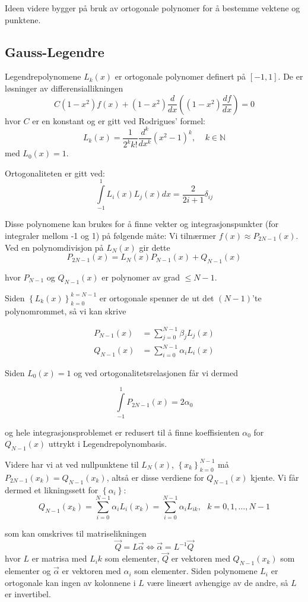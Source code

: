 \documentclass[norsk, 12pt]{article}
\newcommand{\f}{\frac}
\begin{document}
Ideen videre bygger på bruk av ortogonale polynomer for å bestemme vektene og punktene.

\subsection{Gauss-Legendre}
Legendrepolynomene $L_k(x)$ er ortogonale polynomer definert på $[-1, 1]$. De er løsninger av differensiallikningen
$$C(1-x^2)f(x)+(1-x^2)\f{d}{dx}\left((1-x^2)\f{df}{dx}\right)=0$$
hvor $C$ er en konstant og er gitt ved Rodrigues' formel:
$$L_k(x) = \f{1}{2^kk!}\f{d^k}{dx^k}(x^2-1)^k,\ \ \ \ \ k\in\mathbb{N}$$
med $L_0(x) = 1$.

Ortogonaliteten er gitt ved:
$$\int\limits_{-1}^1 L_i(x)L_j(x)dx = \f{2}{2i+1}\delta_{ij}$$

Disse polynomene kan brukes for å finne vekter og integrasjonspunkter (for integraler mellom -1 og 1) på følgende måte:
Vi tilnærmer $f(x) \approx P_{2N-1}(x)$. Ved en polynomdivisjon på $L_N(x)$ gir dette
$$P_{2N-1}(x) = L_N(x)P_{N-1}(x)+Q_{N-1}(x)$$

hvor $P_{N-1}$ og $Q_{N-1}(x)$ er polynomer av grad $\leq N-1$.

Siden $\left\{L_k(x)\right\}_{k=0}^{k=N-1}$ er ortogonale spenner de ut det $(N-1)$'te polynomrommet, så vi kan skrive

\begin{align}
 P_{N-1}(x) &= \sum\limits_{j=0}^{N-1}\beta_j L_j(x)\\
 Q_{N-1}(x) &= \sum\limits_{i=0}^{N-1}\alpha_i L_i(x)
\end{align}

Siden $L_0(x) = 1$ og ved ortogonalitetsrelasjonen får vi dermed

$$\int\limits_{-1}^1 P_{2N-1}(x) = 2\alpha_0$$

og hele integrasjonsproblemet er redusert til å finne koeffisienten $\alpha_0$ for $Q_{N-1}(x)$ uttrykt i
Legendrepolynombasis.

Videre har vi at ved nullpunktene til $L_N(x)$, $\left\{x_k\right\}_{k=0}^{N-1}$ må
$P_{2N-1}(x_k) = Q_{N-1}(x_k)$, altså er disse verdiene for $Q_{N-1}(x)$ kjente.
Vi får dermed et likningssett for $\left\{\alpha_i\right\}$:
$$Q_{N-1}(x_k) = \sum\limits_{i=0}^{N-1}\alpha_i L_i(x_k) = \sum_{i=0}^{N-1}\alpha_i L_{ik},\ \ \ k = 0,1,\dots ,N-1$$

som kan omskrives til matriselikningen
$$\vec Q = L\vec\alpha \Leftrightarrow \vec \alpha = L^{-1}\vec Q$$
hvor $L$ er matrisa med $L_ik$ som elementer, $\vec Q$ er vektoren med $Q_{N-1}(x_k)$ som elementer og
$\vec \alpha$ er vektoren med $\alpha_i$ som elementer. Siden polynomene $L_i$ er ortogonale kan ingen av kolonnene
i $L$ være lineært avhengige av de andre, så $L$ er invertibel.
\end{document}
